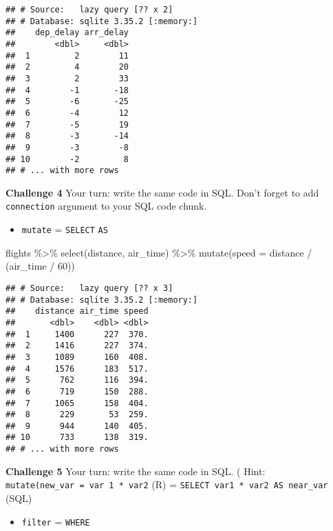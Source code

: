 \documentclass[
]{book}
\newenvironment{Shaded}{\begin{snugshade}}{\end{snugshade}}
\newcommand{\AttributeTok}[1]{\textcolor[rgb]{0.77,0.63,0.00}{#1}}
\newcommand{\DecValTok}[1]{\textcolor[rgb]{0.00,0.00,0.81}{#1}}
\newcommand{\FunctionTok}[1]{\textcolor[rgb]{0.00,0.00,0.00}{#1}}
\newcommand{\NormalTok}[1]{#1}
\newcommand{\SpecialCharTok}[1]{\textcolor[rgb]{0.00,0.00,0.00}{#1}}
\providecommand{\tightlist}{%
  \setlength{\itemsep}{0pt}\setlength{\parskip}{0pt}}
\begin{document}
\begin{verbatim}
## # Source:   lazy query [?? x 2]
## # Database: sqlite 3.35.2 [:memory:]
##    dep_delay arr_delay
##        <dbl>     <dbl>
##  1         2        11
##  2         4        20
##  3         2        33
##  4        -1       -18
##  5        -6       -25
##  6        -4        12
##  7        -5        19
##  8        -3       -14
##  9        -3        -8
## 10        -2         8
## # ... with more rows
\end{verbatim}

\textbf{Challenge 4}
Your turn: write the same code in SQL. Don't forget to add \texttt{connection} argument to your SQL code chunk.

\begin{itemize}
\tightlist
\item
  \texttt{mutate} = \texttt{SELECT} \texttt{AS}
\end{itemize}

\begin{Shaded}
\begin{Highlighting}[]
\NormalTok{flights }\SpecialCharTok{\%\textgreater{}\%}
  \FunctionTok{select}\NormalTok{(distance, air\_time) }\SpecialCharTok{\%\textgreater{}\%}  
  \FunctionTok{mutate}\NormalTok{(}\AttributeTok{speed =}\NormalTok{ distance }\SpecialCharTok{/}\NormalTok{ (air\_time }\SpecialCharTok{/} \DecValTok{60}\NormalTok{)) }
\end{Highlighting}
\end{Shaded}

\begin{verbatim}
## # Source:   lazy query [?? x 3]
## # Database: sqlite 3.35.2 [:memory:]
##    distance air_time speed
##       <dbl>    <dbl> <dbl>
##  1     1400      227  370.
##  2     1416      227  374.
##  3     1089      160  408.
##  4     1576      183  517.
##  5      762      116  394.
##  6      719      150  288.
##  7     1065      158  404.
##  8      229       53  259.
##  9      944      140  405.
## 10      733      138  319.
## # ... with more rows
\end{verbatim}

\textbf{Challenge 5}
Your turn: write the same code in SQL. (
Hint: \texttt{mutate(new\_var\ =\ var\ 1\ *\ var2} (R) = \texttt{SELECT\ var1\ *\ var2\ AS\ near\_var} (SQL)

\begin{itemize}
\tightlist
\item
  \texttt{filter} = \texttt{WHERE}
\end{itemize}
\end{document}
